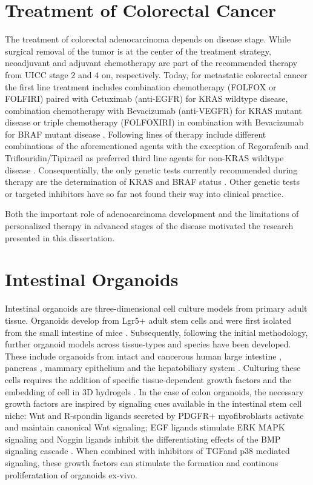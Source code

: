 \begin{flushleft}
\section{Treatment of Colorectal Cancer}
The treatment of colorectal adenocarcinoma depends on disease stage. While surgical removal of the tumor is at the center of the treatment strategy, neoadjuvant and adjuvant chemotherapy are part of the recommended therapy from UICC stage 2 and 4 on, respectively. Today, for metastatic colorectal cancer the first line treatment includes combination chemotherapy (FOLFOX or FOLFIRI) paired with Cetuximab (anti-EGFR) for KRAS wildtype disease, combination chemotherapy with Bevacizumab (anti-VEGFR) for KRAS mutant disease or triple chemotherapy (FOLFOXIRI) in combination with Bevacizumab for BRAF mutant disease \cite{Cutsem}. Following lines of therapy include different combinations of the aforementioned agents with the exception of Regorafenib and Triflouridin/Tipiracil as preferred third line agents for non-KRAS wildtype disease \cite{Cutsem}. Consequentially, the only genetic tests currently recommended during therapy are the determination of KRAS and BRAF status \cite{Cutsem}. Other genetic tests or targeted inhibitors have so far not found their way into clinical practice.\par

Both the important role of adenocarcinoma development and the limitations of personalized therapy in advanced stages of the disease motivated the research presented in this dissertation.

\section{Intestinal Organoids}
Intestinal organoids are three-dimensional cell culture models from primary adult tissue. Organoids develop from Lgr5+ adult stem cells and were first isolated from the small intestine of mice \cite{Sato2011}. Subsequently, following the initial methodology, further organoid models across tissue-types and species have been developed. These include organoids from intact and cancerous human large intestine \cite{Sato2011}, pancreas \cite{Sachs2017}, mammary epithelium \cite{Zhang2016EstablishingCells, Sachs2017AHeterogeneity}and the hepatobiliary system \cite{Huch2013NIHAccess, Broutier2016CultureManipulation.}.
Culturing these cells requires the addition of specific tissue-dependent growth factors and the embedding of cell in 3D hydrogels \cite{Merker2016GastrointestinalOut}. In the case of colon organoids, the necessary growth factors are inspired by signaling cues available in the intestinal stem cell niche: Wnt and R-spondin ligands secreted by PDGFR+ myofibroblasts activate and maintain canonical Wnt signaling; EGF ligands stimulate ERK MAPK signaling and Noggin ligands inhibit the differentiating effects of the BMP signaling cascade \cite{Sato2013}. When combined with inhibitors of TGF\textbeta and p38 mediated signaling, these growth factors can stimulate the formation and continous proliferatation of organoids ex-vivo. 


\end{flushleft}
